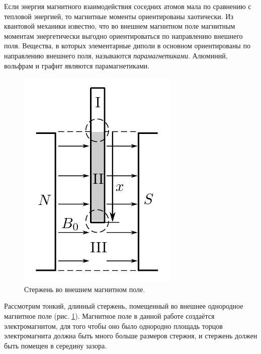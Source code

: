 Если энергия магнитного взаимодействия соседних атомов мала по сравнению с тепловой энергией, то магнитные моменты ориентированы хаотически. Из квантовой механики известно, что во внешнем магнитном поле магнитным моментам энергетически выгодно ориентироваться по направлению внешнего поля. Вещества, в которых элементарные диполи в основном ориентированы по направлению внешнего поля, называются \textit{парамагнетиками}. Алюминий, вольфрам и графит являются парамагнетиками.

\begin{figure}
	\includegraphics[width=\linewidth]{../res/rod.png}
	\caption{Стержень во внешнем магнитном поле.}
	\label{img:rod}
\end{figure}

Рассмотрим тонкий, длинный стержень, помещенный во внешнее однородное магнитное поле (рис. \ref{img:rod}). Магнитное поле в данной работе создаётся электромагнитом, для того чтобы оно было однородно площадь торцов электромагнита должна быть много больше размеров стержня, и стержень должен быть помещен в середину зазора.

